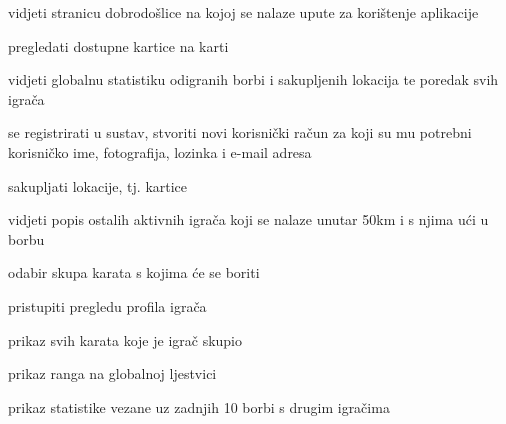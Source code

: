 			
			\begin{packed_enum}
				\item  {}
				
				\begin{packed_enum}
					
					\item vidjeti stranicu dobrodošlice na kojoj se nalaze upute za korištenje aplikacije
					\item pregledati dostupne kartice na karti
					\item vidjeti globalnu statistiku odigranih borbi i sakupljenih lokacija te poredak svih igrača
					\item se registrirati u sustav, stvoriti novi korisnički račun za koji su mu potrebni korisničko ime, fotografija, lozinka i e-mail adresa
					
				\end{packed_enum}
			
				\item  {}
				
				\begin{packed_enum}
					
					\item sakupljati lokacije, tj. kartice
					\item vidjeti popis ostalih aktivnih igrača koji se nalaze unutar 50km i s njima ući u borbu
					
					\begin{packed_enum}
					    
					    \item odabir skupa karata s kojima će se boriti
					    
					\end{packed_enum}
					
					\item pristupiti pregledu profila igrača
					
					\begin{packed_enum}
					    
					    \item prikaz svih karata koje je igrač skupio
					    \item prikaz ranga na globalnoj ljestvici
					    \item prikaz statistike vezane uz zadnjih 10 borbi s drugim igračima
					    
					\end{packed_enum}
					

\end{packed_enum}
\end{packed_enum}
